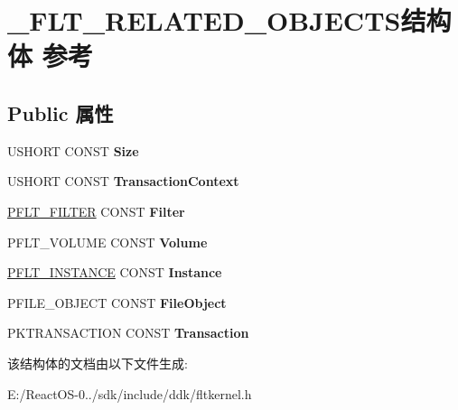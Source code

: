 \hypertarget{struct___f_l_t___r_e_l_a_t_e_d___o_b_j_e_c_t_s}{}\section{\+\_\+\+F\+L\+T\+\_\+\+R\+E\+L\+A\+T\+E\+D\+\_\+\+O\+B\+J\+E\+C\+T\+S结构体 参考}
\label{struct___f_l_t___r_e_l_a_t_e_d___o_b_j_e_c_t_s}
\subsection*{Public 属性}
\begin{DoxyCompactItemize}
\item 
\mbox{\label{struct___f_l_t___r_e_l_a_t_e_d___o_b_j_e_c_t_s_afd57f8cc0def8c3305976dbea5ba167d}} 
U\+S\+H\+O\+RT C\+O\+N\+ST {\bfseries Size}
\item 
\mbox{\label{struct___f_l_t___r_e_l_a_t_e_d___o_b_j_e_c_t_s_a54a7ab32d5a3c2ed631dc83cd6ec1a22}} 
U\+S\+H\+O\+RT C\+O\+N\+ST {\bfseries Transaction\+Context}
\item 
\mbox{\label{struct___f_l_t___r_e_l_a_t_e_d___o_b_j_e_c_t_s_adad3c9d7ae8004ecaac3d935e9d61e61}} 
\hyperlink{struct___f_l_t___f_i_l_t_e_r}{P\+F\+L\+T\+\_\+\+F\+I\+L\+T\+ER} C\+O\+N\+ST {\bfseries Filter}
\item 
\mbox{\label{struct___f_l_t___r_e_l_a_t_e_d___o_b_j_e_c_t_s_abebc7d399b26d0ac86af9dd51e68df9f}} 
P\+F\+L\+T\+\_\+\+V\+O\+L\+U\+ME C\+O\+N\+ST {\bfseries Volume}
\item 
\mbox{\label{struct___f_l_t___r_e_l_a_t_e_d___o_b_j_e_c_t_s_a034c432410ab54d36b934afcaa62e85b}} 
\hyperlink{struct___f_l_t___i_n_s_t_a_n_c_e}{P\+F\+L\+T\+\_\+\+I\+N\+S\+T\+A\+N\+CE} C\+O\+N\+ST {\bfseries Instance}
\item 
\mbox{\label{struct___f_l_t___r_e_l_a_t_e_d___o_b_j_e_c_t_s_a56c3e0da8da64eb3399bc0600039ee98}} 
P\+F\+I\+L\+E\+\_\+\+O\+B\+J\+E\+CT C\+O\+N\+ST {\bfseries File\+Object}
\item 
\mbox{\label{struct___f_l_t___r_e_l_a_t_e_d___o_b_j_e_c_t_s_a5f591b44ca1d3bc1c99d013603361852}} 
P\+K\+T\+R\+A\+N\+S\+A\+C\+T\+I\+ON C\+O\+N\+ST {\bfseries Transaction}
\end{DoxyCompactItemize}


该结构体的文档由以下文件生成\+:\begin{DoxyCompactItemize}
\item 
E\+:/\+React\+O\+S-\/0../sdk/include/ddk/fltkernel.\+h\end{DoxyCompactItemize}
